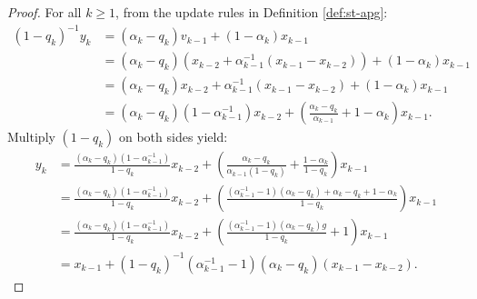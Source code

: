 \documentclass[12pt]{article}
\begin{document}
    \begin{proof}
        For all $k\ge 1$, from the update rules in Definition \ref{def:st-apg}: 
        \begin{align*}
            (1 - q_k)^{-1}y_k &= 
            (\alpha_k - q_k) v_{k - 1} 
            + (1 - \alpha_k)x_{k - 1}
            \\
            &= 
            (\alpha_k - q_k)\left(
                x_{k - 2} + \alpha_{k - 1}^{-1}(x_{k - 1} - x_{k - 2})
            \right) 
            + (1 - \alpha_k)x_{k - 1}
            \\
            &= 
            (\alpha_k - q_k)x_{k - 2} 
            + \alpha_{k - 1}^{-1}(x_{k - 1} - x_{k - 2}) + (1 - \alpha_k)x_{k - 1}
            \\
            &= (\alpha_k - q_k)(1 - \alpha_{k - 1}^{-1})x_{k - 2}
            + \left(
                \frac{\alpha_k - q_k}{\alpha_{k - 1}} + 1 - \alpha_k
            \right)x_{k - 1}. 
        \end{align*}
        Multiply $(1 - q_k)$ on both sides yield: 
        \begin{align*}
            y_k &= 
            \frac{(\alpha_k - q_k)(1 - \alpha_{k - 1}^{-1})}{1 - q_k}x_{k - 2} 
            + \left(
                \frac{\alpha_k - q_k}{\alpha_{k - 1}(1 - q_k)} + \frac{1 - \alpha_k}{1 - q_k}
            \right)x_{k - 1}
            \\
            &= 
            \frac{(\alpha_k - q_k)(1 - \alpha_{k - 1}^{-1})}{1 - q_k}x_{k - 2} 
            + \left(
                \frac{
                    (\alpha_{k - 1}^{-1} -1)(\alpha_k - q_k)
                    + \alpha_k - q_k + 1 - \alpha_k
                }{1 - q_k}
            \right)x_{k - 1}
            \\
            &= \frac{(\alpha_k - q_k)(1 - \alpha_{k - 1}^{-1})}{1 - q_k}x_{k - 2} 
            + \left(
                \frac{
                    (\alpha_{k - 1}^{-1} -1)(\alpha_k - q_k)g 
                }{1 - q_k} + 1
            \right)x_{k - 1}
            \\
            &= x_{k -1} + (1 - q_k)^{-1}\left(\alpha_{k - 1}^{-1} - 1\right)(\alpha_k - q_k)(x_{k - 1} - x_{k - 2}). 
        \end{align*}
    \end{proof}
    
\end{document}
